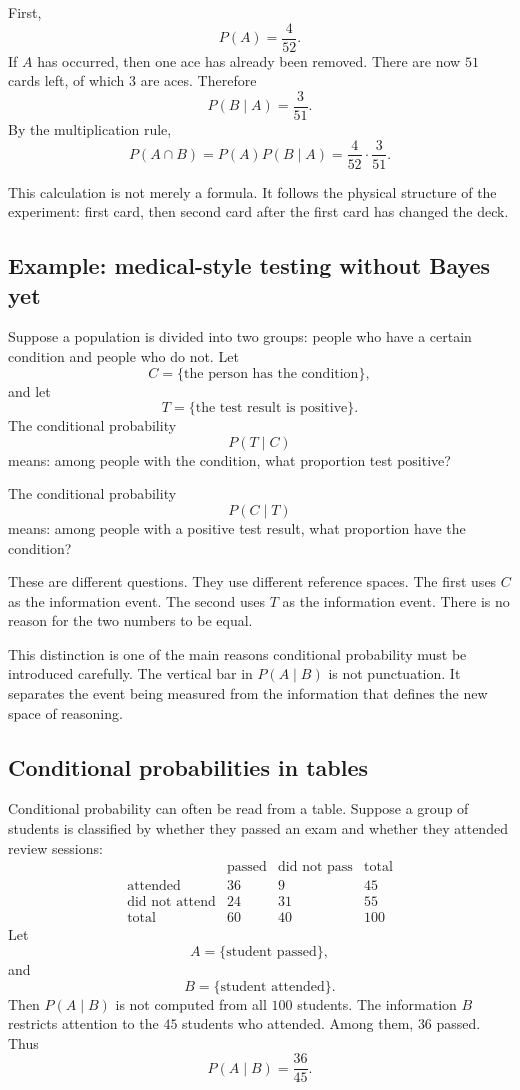 First,
\[
P(A)=\frac4{52}.
\]
If \(A\) has occurred, then one ace has already been removed. There are now
\(51\) cards left, of which \(3\) are aces. Therefore
\[
P(B\mid A)=\frac3{51}.
\]
By the multiplication rule,
\[
P(A\cap B)=P(A)P(B\mid A)=\frac4{52}\cdot\frac3{51}.
\]

This calculation is not merely a formula. It follows the physical structure of
the experiment: first card, then second card after the first card has changed the
deck.

\subsection*{Example: medical-style testing without Bayes yet}

Suppose a population is divided into two groups: people who have a certain
condition and people who do not. Let
\[
C=\{\text{the person has the condition}\},
\]
and let
\[
T=\{\text{the test result is positive}\}.
\]
The conditional probability
\[
P(T\mid C)
\]
means: among people with the condition, what proportion test positive?

The conditional probability
\[
P(C\mid T)
\]
means: among people with a positive test result, what proportion have the
condition?

These are different questions. They use different reference spaces. The first
uses \(C\) as the information event. The second uses \(T\) as the information
event. There is no reason for the two numbers to be equal.

This distinction is one of the main reasons conditional probability must be
introduced carefully. The vertical bar in \(P(A\mid B)\) is not punctuation. It
separates the event being measured from the information that defines the new
space of reasoning.

\subsection*{Conditional probabilities in tables}

Conditional probability can often be read from a table. Suppose a group of
students is classified by whether they passed an exam and whether they attended
review sessions:
\[
\begin{array}{c|cc|c}
 & \text{passed} & \text{did not pass} & \text{total}\\
\hline
\text{attended} & 36 & 9 & 45\\
\text{did not attend} & 24 & 31 & 55\\
\hline
\text{total} & 60 & 40 & 100
\end{array}
\]
Let
\[
A=\{\text{student passed}\},
\]
and
\[
B=\{\text{student attended}\}.
\]
Then \(P(A\mid B)\) is not computed from all \(100\) students. The information
\(B\) restricts attention to the \(45\) students who attended. Among them,
\(36\) passed. Thus
\[
P(A\mid B)=\frac{36}{45}.
\]

